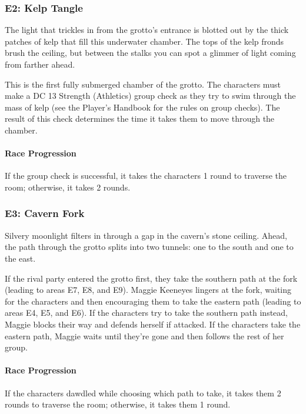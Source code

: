 \documentclass[10pt,a4paper,twoside,twocolumn,openany,nodeprecatedcode]{dndbook}
\begin{document}
\subsubsection{E2: Kelp Tangle}
\begin{DndReadAloud}{}
The light that trickles in from the grotto's entrance is blotted out by the thick patches of kelp that fill this underwater chamber. The tops of the kelp fronds brush the ceiling, but between the stalks you can spot a glimmer of light coming from farther ahead.

\end{DndReadAloud}

This is the first fully submerged chamber of the grotto. The characters must make a DC 13 Strength (Athletics) group check as they try to swim through the mass of kelp (see the Player's Handbook for the rules on group checks). The result of this check determines the time it takes them to move through the chamber.

\paragraph{Race Progression}
If the group check is successful, it takes the characters 1 round to traverse the room; otherwise, it takes 2 rounds.

\subsubsection{E3: Cavern Fork}
\begin{DndReadAloud}{}
Silvery moonlight filters in through a gap in the cavern's stone ceiling. Ahead, the path through the grotto splits into two tunnels: one to the south and one to the east.

\end{DndReadAloud}

If the rival party entered the grotto first, they take the southern path at the fork (leading to areas E7, E8, and E9). Maggie Keeneyes lingers at the fork, waiting for the characters and then encouraging them to take the eastern path (leading to areas E4, E5, and E6). If the characters try to take the southern path instead, Maggie blocks their way and defends herself if attacked. If the characters take the eastern path, Maggie waits until they're gone and then follows the rest of her group.

\paragraph{Race Progression}
If the characters dawdled while choosing which path to take, it takes them 2 rounds to traverse the room; otherwise, it takes them 1 round.
\end{document}
